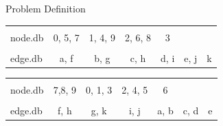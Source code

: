 \documentclass[rgb]{beamer}
\begin{document}
\begin{frame}[allowframebreaks]{Problem Definition}
             \begin{table}[htp]
                \centering
                \begin{tabular}[c]{|l|c|c|c|c|c|c|} \hline
                &&&&&&\\[-1em]
                node.db & \colorbox{blue!30}{0}, \colorbox{red!30}{5}, \colorbox{green!30}{7} & \colorbox{blue!30}{1}, \colorbox{blue!30}{4}, \colorbox{green!30}{9} & \colorbox{blue!30}{2}, \colorbox{red!30}{6}, \colorbox{green!30}{8} & \colorbox{blue!30}{3} &  & \\ \hline
                &&&&&&\\[-1em]
                edge.db & \colorbox{blue!30}{a}, \colorbox{green!30}{f} & \colorbox{blue!30}{b}, \colorbox{green!30}{g} & \colorbox{blue!30}{c}, \colorbox{green!30}{h} & \colorbox{blue!30}{d}, \colorbox{green!30}{i} & \colorbox{red!30}{e}, \colorbox{green!30}{j} & \colorbox{green!30}{k} \\  \hline
                \end{tabular}
                \vspace{0.5cm}
                
                \begin{tabular}{|l | c | c | c | c | c | c|} \hline
                &&&&&&\\[-1em]
                node.db & \colorbox{green!30}{7},\colorbox{green!30}{8}, \colorbox{green!30}{9} & \colorbox{blue!30}{0}, \colorbox{blue!30}{1}, \colorbox{blue!30}{3} & \colorbox{blue!30}{2}, \colorbox{blue!30}{4}, \colorbox{red!30}{5} & \colorbox{red!30}{6} &  & \\ \hline
                &&&&&&\\[-1em]
                 edge.db &  \colorbox{green!30}{f}, \colorbox{green!30}{h} & \colorbox{green!30}{g}, \colorbox{green!30}{k} & \colorbox{green!30}{i}, \colorbox{green!30}{j} & \colorbox{blue!30}{a}, \colorbox{blue!30}{b} & \colorbox{blue!30}{c}, \colorbox{blue!30}{d} & \colorbox{red!30}{e} \\ \hline
                \end{tabular}
            \end{table}
            

\end{frame}
\end{document}
